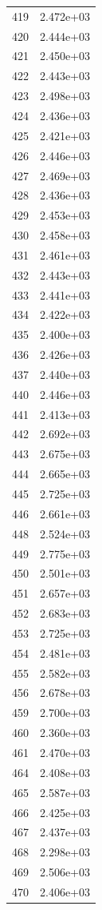 \documentclass[12pt]{article}
\begin{document}
\begin{longtable}{@{}cc@{}}
419 & 2.472e+03 \\
420 & 2.444e+03 \\
421 & 2.450e+03 \\
422 & 2.443e+03 \\
423 & 2.498e+03 \\
424 & 2.436e+03 \\
425 & 2.421e+03 \\
426 & 2.446e+03 \\
427 & 2.469e+03 \\
428 & 2.436e+03 \\
429 & 2.453e+03 \\
430 & 2.458e+03 \\
431 & 2.461e+03 \\
432 & 2.443e+03 \\
433 & 2.441e+03 \\
434 & 2.422e+03 \\
435 & 2.400e+03 \\
436 & 2.426e+03 \\
437 & 2.440e+03 \\
440 & 2.446e+03 \\
441 & 2.413e+03 \\
442 & 2.692e+03 \\
443 & 2.675e+03 \\
444 & 2.665e+03 \\
445 & 2.725e+03 \\
446 & 2.661e+03 \\
448 & 2.524e+03 \\
449 & 2.775e+03 \\
450 & 2.501e+03 \\
451 & 2.657e+03 \\
452 & 2.683e+03 \\
453 & 2.725e+03 \\
454 & 2.481e+03 \\
455 & 2.582e+03 \\
456 & 2.678e+03 \\
459 & 2.700e+03 \\
460 & 2.360e+03 \\
461 & 2.470e+03 \\
464 & 2.408e+03 \\
465 & 2.587e+03 \\
466 & 2.425e+03 \\
467 & 2.437e+03 \\
468 & 2.298e+03 \\
469 & 2.506e+03 \\
470 & 2.406e+03 \\

\end{longtable}
\end{document}
